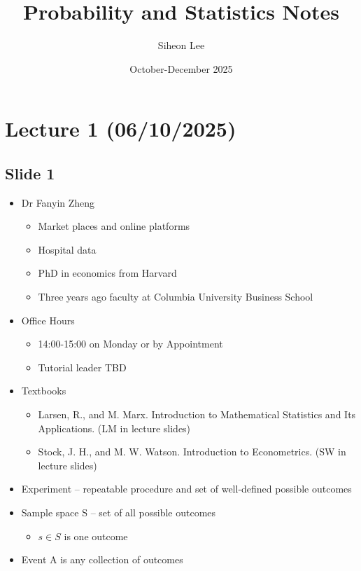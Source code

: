 \documentclass{article}
\title{Probability and Statistics Notes}
\author{Siheon Lee}
\date{October-December 2025}
\begin{document}
\maketitle
\tableofcontents
\newpage

\section{Lecture 1 (06/10/2025)}
\subsection{Slide 1}
\begin{itemize}
    \item Dr Fanyin Zheng
    \begin{itemize}
        \item Market places and online platforms
        \item Hospital data
        \item PhD in economics from Harvard
        \item Three years ago faculty at Columbia University Business School
    \end{itemize}
    \item Office Hours
    \begin{itemize}
        \item 14:00-15:00 on Monday or by Appointment
        \item Tutorial leader TBD
    \end{itemize}
    \item Textbooks
    \begin{itemize}
        \item Larsen, R., and M. Marx. Introduction to Mathematical Statistics and Its Applications. (LM in lecture slides)
        \item Stock, J. H., and M. W. Watson. Introduction to Econometrics. (SW in lecture slides)
    \end{itemize}
    \item 	Experiment – repeatable procedure and set of well-defined possible outcomes
	\item Sample space S – set of all possible outcomes
    \begin{itemize}
        \item $s \in S$ is one outcome
    \end{itemize}
    \item Event A is any collection of outcomes
    \begin{itemize}

\end{itemize}
\end{itemize}
\end{document}
